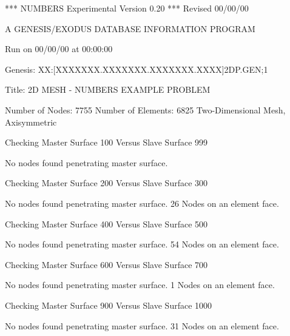 
                    *** NUMBERS Experimental Version 0.20 ***
                                Revised 00/00/00

                  A GENESIS/EXODUS DATABASE INFORMATION PROGRAM

                           Run on 00/00/00 at 00:00:00

     Genesis: XX:[XXXXXXX.XXXXXXX.XXXXXXX.XXXX]2DP.GEN;1

     Title:   2D MESH - NUMBERS EXAMPLE PROBLEM

     Number of Nodes:      7755
     Number of Elements:   6825
     Two-Dimensional Mesh, Axisymmetric

 Checking Master Surface   100 Versus Slave Surface   999

 No nodes found penetrating master surface.

 Checking Master Surface   200 Versus Slave Surface   300

 No nodes found penetrating master surface.
    26 Nodes on an element face.

 Checking Master Surface   400 Versus Slave Surface   500

 No nodes found penetrating master surface.
    54 Nodes on an element face.

 Checking Master Surface   600 Versus Slave Surface   700

 No nodes found penetrating master surface.
     1 Nodes on an element face.

 Checking Master Surface   900 Versus Slave Surface  1000

 No nodes found penetrating master surface.
    31 Nodes on an element face.
